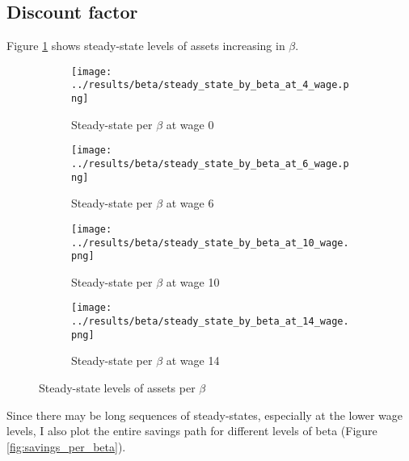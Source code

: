 \documentclass[12pt]{article}
\begin{document}
\clearpage


\subsection{Discount factor}

Figure \ref{fig:ss_per_beta} shows steady-state levels of assets increasing in $\beta$.

\begin{figure}[hbt!]

\begin{subfigure}{0.5\textwidth}
\texttt{[image: ../results/beta/steady\_state\_by\_beta\_at\_4\_wage.png]}
\caption{Steady-state per $\beta$ at wage 0}
\end{subfigure}%
\begin{subfigure}{0.5\textwidth}
\texttt{[image: ../results/beta/steady\_state\_by\_beta\_at\_6\_wage.png]}
\caption{Steady-state per $\beta$ at wage 6}
\end{subfigure}

\begin{subfigure}{0.5\textwidth}
\texttt{[image: ../results/beta/steady\_state\_by\_beta\_at\_10\_wage.png]}
\caption{Steady-state per $\beta$ at wage 10}
\end{subfigure}%
\begin{subfigure}{0.5\textwidth}
\texttt{[image: ../results/beta/steady\_state\_by\_beta\_at\_14\_wage.png]}
\caption{Steady-state per $\beta$ at wage 14}
\end{subfigure}

\caption{Steady-state levels of assets per $\beta$}
\label{fig:ss_per_beta}
\end{figure}

Since there may be long sequences of steady-states, especially at the lower wage levels, I also plot the entire savings path for different levels of beta (Figure \ref{fig:savings_per_beta}).
\end{document}
